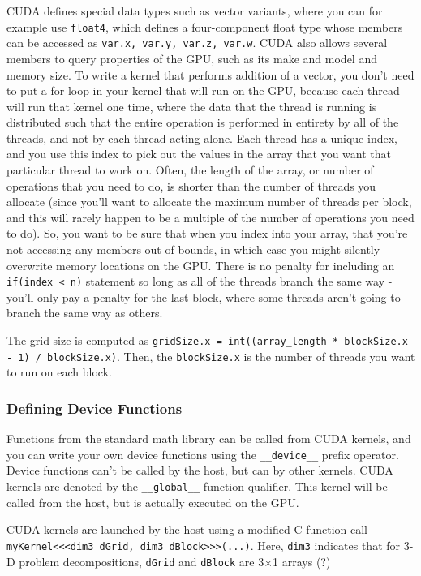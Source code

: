\documentclass[10pt]{article}
\begin{document}
\begin{flushleft}
CUDA defines special data types such as vector variants, where you can for example use {\tt float4}, which defines a four-component float type whose members can be accessed as {\tt var.x, var.y, var.z, var.w}. CUDA also allows several members to query properties of the GPU, such as its make and model and memory size. To write a kernel that performs addition of a vector, you don't need to put a for-loop in your kernel that will run on the GPU, because each thread will run that kernel one time, where the data that the thread is running is distributed such that the entire operation is performed in entirety by all of the threads, and not by each thread acting alone. Each thread has a unique index, and you use this index to pick out the values in the array that you want that particular thread to work on. Often, the length of the array, or number of operations that you need to do, is shorter than the number of threads you allocate (since you'll want to allocate the maximum number of threads per block, and this will rarely happen to be a multiple of the number of operations you need to do). So, you want to be sure that when you index into your array, that you're not accessing any members out of bounds, in which case you might silently overwrite memory locations on the GPU. There is no penalty for including an {\tt if(index < n)} statement so long as all of the threads branch the same way - you'll only pay a penalty for the last block, where some threads aren't going to branch the same way as others.

The grid size is computed as {\tt gridSize.x = int((array\_length * blockSize.x - 1) / blockSize.x)}. Then, the {\tt blockSize.x} is the number of threads you want to run on each block. 

\subsubsection{Defining Device Functions}

Functions from the standard math library can be called from CUDA kernels, and you can write your own device functions using the {\tt \_\_device\_\_} prefix operator. Device functions can't be called by the host, but can by other kernels. CUDA kernels are denoted by the {\tt \_\_global\_\_} function qualifier. This kernel will be called from the host, but is actually executed on the GPU. 

CUDA kernels are launched by the host using a modified C function call {\tt myKernel<<<dim3 dGrid, dim3 dBlock>>>(...)}. Here, {\tt dim3} indicates that for 3-D problem decompositions, {\tt dGrid} and {\tt dBlock} are 3\(\times\)1 arrays (?)


\end{flushleft}
\end{document}
